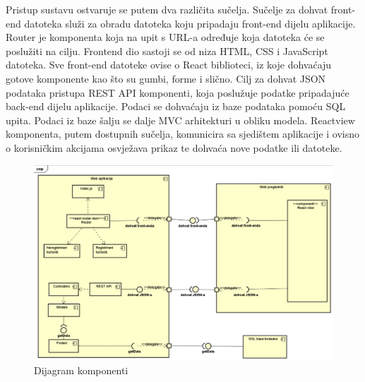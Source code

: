 			 Pristup sustavu ostvaruje se putem dva različita sučelja. Sučelje za dohvat front-end datoteka služi za obradu datoteka koju pripadaju front-end dijelu aplikacije. Router je komponenta koja na upit s URL-a određuje koja datoteka će se poslužiti na cilju. Frontend dio sastoji se od niza HTML, CSS i JavaScript datoteka. Sve front-end datoteke ovise o React biblioteci, iz koje dohvaćaju gotove komponente kao što su gumbi, forme i slično. Cilj za dohvat JSON podataka pristupa REST API komponenti, koja poslužuje podatke pripadajuće back-end dijelu aplikacije. Podaci se dohvaćaju iz baze podataka pomoću SQL upita. Podaci iz baze šalju se dalje MVC arhitekturi u obliku modela. Reactview komponenta, putem dostupnih sučelja, komunicira sa sjedištem aplikacije i ovisno o korisničkim akcijama osvježava prikaz te dohvaća nove podatke ili datoteke.
			 
			 \begin{figure}[H]
			 	\includegraphics[width=\textwidth]{dijagram_komponenti.JPEG}
			 	\centering
			 	\caption{Dijagram komponenti}
			 	\label{fig:dijagramkomponenti}
			 \end{figure}